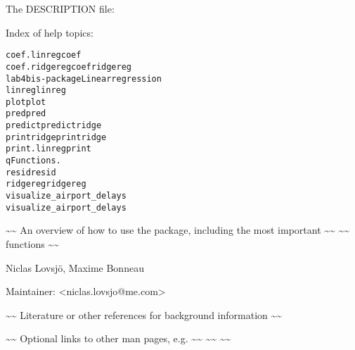 \documentclass[a4paper]{book}
\begin{document}
\begin{Details}\relax

The DESCRIPTION file:


Index of help topics:
\begin{alltt}
coef.linreg             coef
coef.ridgereg           coef ridgereg
lab4bis-package         Linear regression
linreg                  linreg
plot                    plot
pred                    pred
predict                 predict ridge
print ridge             print ridge
print.linreg            print
q                       Functions.
resid                   resid
ridgereg                ridgereg
visualize_airport_delays
                        visualize_airport_delays
\end{alltt}

\textasciitilde{}\textasciitilde{} An overview of how to use the package, including the most important \textasciitilde{}\textasciitilde{}
\textasciitilde{}\textasciitilde{} functions \textasciitilde{}\textasciitilde{}
\end{Details}
%
\begin{Author}\relax
Niclas Lovsjö, Maxime Bonneau   

Maintainer: <niclas.lovsjo@me.com>
\end{Author}
%
\begin{References}\relax
\textasciitilde{}\textasciitilde{} Literature or other references for background information \textasciitilde{}\textasciitilde{}
\end{References}
%
\begin{SeeAlso}\relax
\textasciitilde{}\textasciitilde{} Optional links to other man pages, e.g. \textasciitilde{}\textasciitilde{}
\textasciitilde{}\textasciitilde{}  \textasciitilde{}\textasciitilde{}
\end{SeeAlso}
\end{document}
